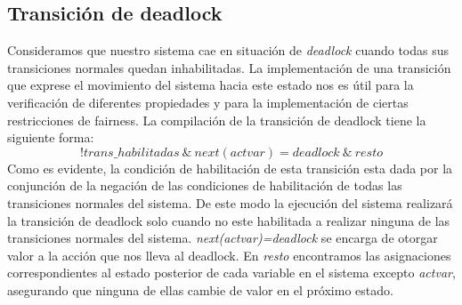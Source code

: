 \documentclass[titlepage, 12pt]{book}
\begin{document}
\subsection*{Transici\'on de deadlock}
Consideramos que nuestro sistema cae en situaci\'on de \textit{deadlock} cuando todas sus transiciones normales quedan inhabilitadas. La implementaci\'on de una transici\'on que exprese el movimiento del sistema hacia este estado nos es \'util para la verificaci\'on de diferentes propiedades y para la implementaci\'on de ciertas restricciones de fairness. La compilaci\'on de la transici\'on de deadlock tiene la siguiente forma:
$$!trans\_habilitadas~\&~next(actvar)=deadlock~\&~resto$$
Como es evidente, la condici\'on de habilitaci\'on de esta transici\'on esta dada por la conjunci\'on de la negaci\'on de las condiciones de habilitaci\'on de todas las transiciones normales del sistema. De este modo la ejecuci\'on del sistema realizar\'a la transici\'on de deadlock solo cuando no este habilitada a realizar ninguna de las transiciones normales del sistema. \textit{next(actvar)=deadlock} se encarga de otorgar valor a la acci\'on que nos lleva al deadlock. En \textit{resto} encontramos las asignaciones correspondientes al estado posterior de cada variable en el sistema excepto \textit{actvar}, asegurando que ninguna de ellas cambie de valor en el pr\'oximo estado.
\end{document}
